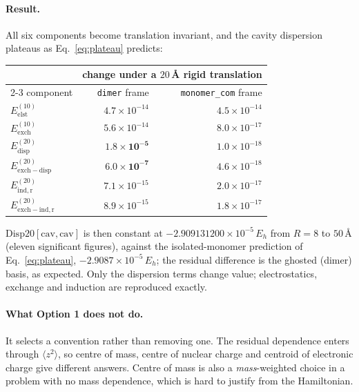 \documentclass[11pt]{article}
\begin{document}
\paragraph{Result.} All six components become translation invariant, and the
cavity dispersion plateaus as Eq.~\eqref{eq:plateau} predicts:

\begin{center}
\small
\begin{tabular}{lrr}
\toprule
& \multicolumn{2}{c}{change under a $20$\,\AA{} rigid translation} \\
\cmidrule(l){2-3}
component & \texttt{dimer} frame & \texttt{monomer\_com} frame \\
\midrule
$E^{(10)}_{\mathrm{elst}}$       & $4.7\times10^{-14}$ & $4.5\times10^{-14}$ \\
$E^{(10)}_{\mathrm{exch}}$       & $5.6\times10^{-14}$ & $8.0\times10^{-17}$ \\
$E^{(20)}_{\mathrm{disp}}$       & $\bm{1.8\times10^{-5}}$ & $1.0\times10^{-18}$ \\
$E^{(20)}_{\mathrm{exch-disp}}$  & $\bm{6.0\times10^{-7}}$ & $4.6\times10^{-18}$ \\
$E^{(20)}_{\mathrm{ind,r}}$      & $7.1\times10^{-15}$ & $2.0\times10^{-17}$ \\
$E^{(20)}_{\mathrm{exch-ind,r}}$ & $8.9\times10^{-15}$ & $1.8\times10^{-17}$ \\
\bottomrule
\end{tabular}
\end{center}

\noindent
$\mathrm{Disp20[cav,cav]}$ is then constant at $-2.909131200\times10^{-5}\,E_h$
from $R = 8$ to $50$\,\AA{} (eleven significant figures), against the
isolated-monomer prediction of Eq.~\eqref{eq:plateau},
$-2.9087\times10^{-5}\,E_h$; the residual difference is the ghosted (dimer)
basis, as expected. Only the dispersion terms change value; electrostatics,
exchange and induction are reproduced exactly.

\paragraph{What Option 1 does not do.} It selects a convention rather than
removing one. The residual dependence enters through $\langle z^2\rangle$, so
centre of mass, centre of nuclear charge and centroid of electronic charge give
different answers. Centre of mass is also a \emph{mass}-weighted choice in a
problem with no mass dependence, which is hard to justify from the Hamiltonian.
\end{document}

